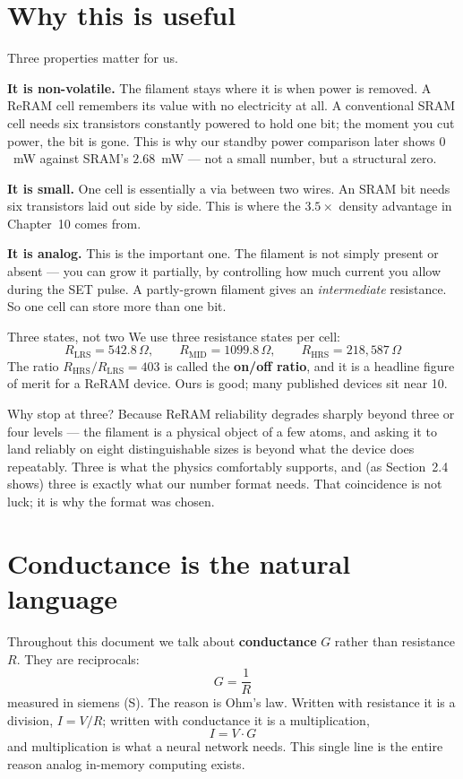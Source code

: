 \documentclass[11pt,a4paper]{report}
\newcommand{\jargon}[1]{\textcolor{acc}{\textbf{#1}}}
\begin{document}
\section{Why this is useful}

Three properties matter for us.

\textbf{It is non-volatile.} The filament stays where it is when power is
removed. A ReRAM cell remembers its value with no electricity at all. A
conventional SRAM cell needs six transistors constantly powered to hold one
bit; the moment you cut power, the bit is gone. This is why our standby power
comparison later shows $0$~mW against SRAM's $2.68$~mW --- not a small number,
but a structural zero.

\textbf{It is small.} One cell is essentially a via between two wires. An SRAM
bit needs six transistors laid out side by side. This is where the
$3.5\times$ density advantage in Chapter~10 comes from.

\textbf{It is analog.} This is the important one. The filament is not simply
present or absent --- you can grow it partially, by controlling how much
current you allow during the SET pulse. A partly-grown filament gives an
\emph{intermediate} resistance. So one cell can store more than one bit.

\begin{keybox}{Three states, not two}
We use three resistance states per cell:
\[
R_{\mathrm{LRS}} = 542.8\,\Omega, \qquad
R_{\mathrm{MID}} = 1099.8\,\Omega, \qquad
R_{\mathrm{HRS}} = 218{,}587\,\Omega
\]
The ratio $R_{\mathrm{HRS}}/R_{\mathrm{LRS}} = 403$ is called the
\jargon{on/off ratio}, and it is a headline figure of merit for a ReRAM
device. Ours is good; many published devices sit near 10.

Why stop at three? Because ReRAM reliability degrades sharply beyond three or
four levels --- the filament is a physical object of a few atoms, and asking
it to land reliably on eight distinguishable sizes is beyond what the device
does repeatably. Three is what the physics comfortably supports, and (as
Section~2.4 shows) three is exactly what our number format needs. That
coincidence is not luck; it is why the format was chosen.
\end{keybox}

\section{Conductance is the natural language}

Throughout this document we talk about \jargon{conductance} $G$ rather than
resistance $R$. They are reciprocals:
\[
G = \frac{1}{R}
\]
measured in siemens (S). The reason is Ohm's law. Written with resistance it
is a division, $I = V/R$; written with conductance it is a multiplication,
\[
\boxed{\,I = V \cdot G\,}
\]
and multiplication is what a neural network needs. This single line is the
entire reason analog in-memory computing exists.
\end{document}
